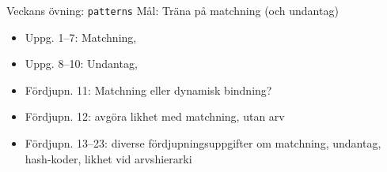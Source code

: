 

\ifkompendium\else
{}

\begin{SlideExtra}{Veckans övning: \texttt{patterns}}
  Mål: Träna på matchning (och undantag)
\begin{itemize}\SlideFontSmall
\item Uppg. 1--7: Matchning, 
\item Uppg. 8--10: Undantag, 
\item Fördjupn. 11: Matchning eller dynamisk bindning?
\item Fördjupn. 12: avgöra likhet med matchning,  utan arv
\item Fördjupn. 13--23: diverse fördjupningsuppgifter om matchning, undantag, hash-koder, likhet vid arvshierarki
\end{itemize}
\end{SlideExtra}


